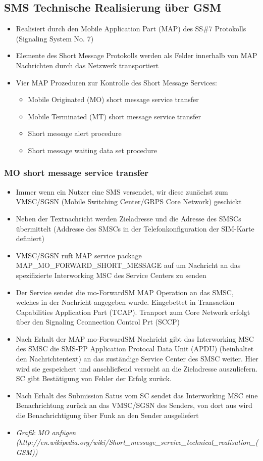 \documentclass[german,12pt,a4paper]{article}
\begin{document}
\subsection{SMS Technische Realisierung über GSM}
\begin{itemize}
	\item Realisiert durch den Mobile Application Part (MAP) des SS\#7 Protokolls (Signaling System No. 7)
	\item Elemente des Short Message Protokolls werden als Felder innerhalb von MAP Nachrichten 
		durch das Netzwerk transportiert
	\item Vier MAP Prozeduren zur Kontrolle des Short Message Services:
		\begin{itemize}
			\item Mobile Originated (MO) short message service transfer
			\item Mobile Terminated (MT) short message service transfer
			\item Short message alert procedure
			\item Short message waiting data set procedure
		\end{itemize}
\end{itemize}

\subsubsection{MO short message service transfer}
\begin{itemize}
	\item Immer wenn ein Nutzer eine SMS versendet, wir diese zunächst zum 
		VMSC/SGSN (Mobile Switching Center/GRPS Core Network) geschickt
	\item Neben der Textnachricht werden Zieladresse und die Adresse des 
		SMSCs übermittelt (Addresse des SMSCs in der Telefonkonfiguration der SIM-Karte 
		definiert)
	\item VMSC/SGSN ruft MAP service package MAP\_MO\_FORWARD\_SHORT\_MESSAGE auf um 
		Nachricht an das spezifizierte Interworking MSC des Service Centers zu senden
	\item Der Service sendet die mo-ForwardSM MAP Operation an das SMSC, welches 
		in der Nachricht angegeben wurde. Eingebettet in Transaction Capabilities Application
		Part (TCAP). Tranport zum Core Network erfolgt über den Signaling Ceonnection 
		Control Prt (SCCP)
	\item Nach Erhalt der MAP mo-ForwardSM Nachricht gibt das Interworking MSC des SMSC die 
		SMS-PP Application Protocal Data Unit (APDU) (beinhaltet den Nachrichtentext) an 
		das zuständige Service Center des SMSC weiter. Hier wird sie gespeichert und 
		anschließend versucht an die Zieladresse auszuliefern. SC gibt Bestätigung von 
		Fehler der Erfolg zurück.
	\item Nach Erhalt des Submission Satus vom SC sendet das Interworking MSC eine 
		Benachrichtung zurück an das VMSC/SGSN des Senders, von dort aus wird die 
		Benachrichtigung über Funk an den Sender ausgeliefert
	\item \textit{Grafik MO anfügen \\(http://en.wikipedia.org/wiki/Short\_message\_service\_technical\_realisation\_(GSM))}
\end{itemize}
\end{document}
